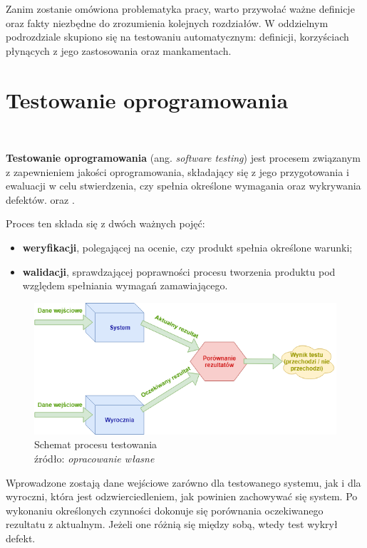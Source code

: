 Zanim zostanie omówiona problematyka pracy, warto przywołać ważne definicje oraz fakty niezbędne do zrozumienia kolejnych rozdziałów. W oddzielnym podrozdziale skupiono się na testowaniu automatycznym: definicji, korzyściach płynących z jego zastosowania oraz mankamentach.


\section{Testowanie oprogramowania} \ 


\begin{df}
\textbf{Testowanie oprogramowania} (ang. \textit{software testing}) jest procesem związanym z zapewnieniem jakości oprogramowania, składający się z jego przygotowania i ewaluacji w celu stwierdzenia, czy spełnia określone wymagania oraz wykrywania defektów. \cite{roman} oraz \cite{myers}.

Proces ten składa się z dwóch ważnych pojęć:
\begin{itemize}
    \item \textbf{weryfikacji}, polegającej na ocenie, czy produkt spełnia określone warunki;
    \item \textbf{walidacji}, sprawdzającej poprawności procesu tworzenia produktu pod względem spełniania wymagań zamawiającego.
\end{itemize}

\end{df}

\begin{figure}[H]
\centering
\captionsetup{justification=centering}
\includegraphics[width=1\textwidth]{Test.png}
\caption[Schemat procesu testowania]{\label{fig:proc}Schemat procesu testowania \\ źródło: \textit{opracowanie własne}}
\end{figure}

Wprowadzone zostają dane wejściowe zarówno dla testowanego systemu, jak i dla wyroczni, która jest odzwierciedleniem, jak powinien zachowywać się system. Po wykonaniu określonych czynności dokonuje się porównania oczekiwanego rezultatu z aktualnym. Jeżeli one różnią się między sobą, wtedy test wykrył defekt.

